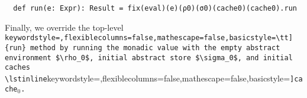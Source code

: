 \begin{lstlisting}
  def run(e: Expr): Result = fix(eval)(e)(ρ0)(σ0)(cache0)(cache0).run
\end{lstlisting}

Finally, we override the top-level \lstinline[keywordstyle=,flexiblecolumns=false,mathescape=false,basicstyle=\tt]{run} method by running the monadic value
with the empty abstract environment $\rho_0$, initial abstract store $\sigma_0$,
and initial caches \lstinline[keywordstyle=,flexiblecolumns=false,mathescape=false,basicstyle=\tt]{cache}$_0$.
